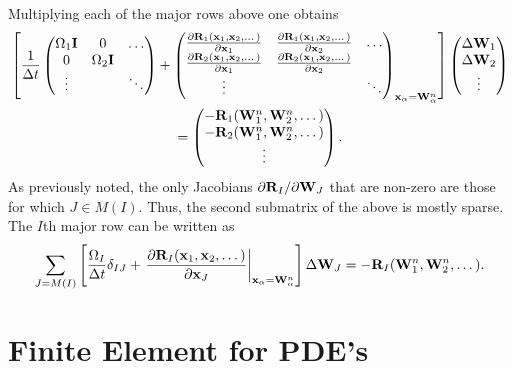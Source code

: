 \documentclass[oneside,a4paper,11pt]{report}
\begin{document}
Multiplying each of the major rows above one obtains
\begin{multline}
    \left [ 
    \frac{1}{\Delta t} \begin{pmatrix} \Omega_1 \mathbf{I} & 0 & \dots \\ 0 & \Omega_2 \mathbf{I} & \\ \vdots &  & \ddots \end{pmatrix} + 
    \begin{pmatrix} \frac{\partial \mathbf{R}_1(\mathbf{x}_1, \mathbf{x}_2, \dots)}{\partial \mathbf{x}_1} & \frac{\partial \mathbf{R}_1(\mathbf{x}_1, \mathbf{x}_2, \dots)}{\partial \mathbf{x}_2} & \dots \\ \frac{\partial \mathbf{R}_2(\mathbf{x}_1, \mathbf{x}_2, \dots)}{\partial \mathbf{x}_1} & \frac{\partial \mathbf{R}_2(\mathbf{x}_1, \mathbf{x}_2, \dots)}{\partial \mathbf{x}_2} & \\ \vdots & & \ddots \end{pmatrix}_{\mathbf{x}_\alpha = \mathbf{W}_\alpha^n} \right ]
    \begin{pmatrix} \Delta \mathbf{W}_1 \\ \Delta \mathbf{W}_2 \\ \vdots \end{pmatrix} \\
    = \begin{pmatrix} -\mathbf{R}_1(\mathbf{W}_1^n, \mathbf{W}_2^n,\dots) \\ -\mathbf{R}_2(\mathbf{W}_1^n, \mathbf{W}_2^n,\dots) \\ \vdots \end{pmatrix}.
\end{multline}
As previously noted, the only Jacobians $\partial \mathbf{R}_I/\partial \mathbf{W}_J$ that are non-zero are those for which $J \in M(I)$. Thus, the second submatrix of the above is mostly sparse. The $I$th major row can be written as
\begin{equation}
\sum\limits_{J = M(I)}  \left[\frac{\Omega_I}{\Delta t}\delta_{IJ} +  \left . \frac{\partial \mathbf{R}_I(\mathbf{x}_1, \mathbf{x}_2, \dots)}{\partial \mathbf{x}_J} \right |_{\mathbf{x}_\alpha = \mathbf{W}_\alpha^n} \right]\Delta \mathbf{W}_J = -\mathbf{R}_I(\mathbf{W}_1^n, \mathbf{W}_2^n,\dots).
\end{equation}

\part{Finite Element for PDE's}

\end{document}
